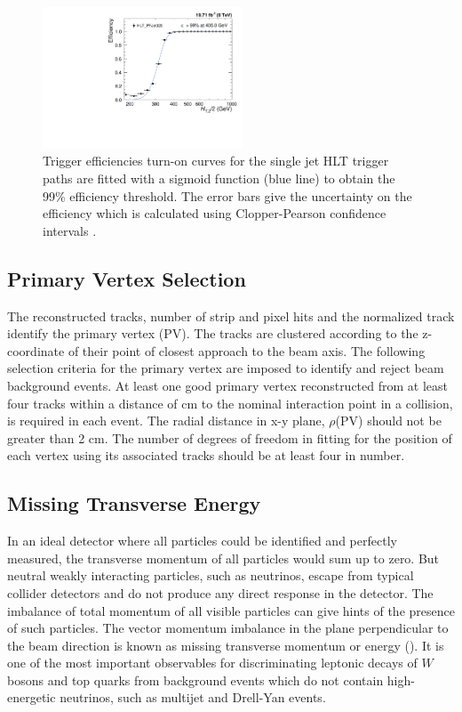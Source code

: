 \begin{figure}[!htbp]
\begin{center}
 \vspace*{6mm}
 \includegraphics[width=0.53\textwidth]{Plots_HT_2_150/Fit_Turn_Efficiency_320_2_ht_2.pdf}
 \caption[Trigger efficiencies turn-on curves for the single jet HLT trigger paths.]{Trigger efficiencies turn-on curves for the single jet HLT trigger paths are fitted with a sigmoid function (blue line) to obtain the 99\% efficiency threshold. The error bars give the uncertainty on the efficiency which is calculated using Clopper-Pearson confidence intervals \cite{10.2307/2331986}.}
 \label{fig:trig_eff}
 \end{center}
\end{figure}

\subsection{Primary Vertex Selection}
The reconstructed tracks, number of strip and pixel hits and the normalized track \chisq identify the primary vertex (PV). The tracks are clustered according to the z-coordinate of their point of closest approach to the beam axis. The following selection criteria for the primary vertex are imposed to identify and reject beam background events. At least one good primary vertex reconstructed from at least four tracks within a distance of  cm to the nominal interaction point in a collision, is required in each event. The radial distance in x-y plane, $\rho$(PV) should not be greater than 2 cm. The number of degrees of freedom in fitting for the position of each vertex using its associated tracks should be at least four in number. 

\subsection{Missing Transverse Energy}
In an ideal detector where all particles could be identified and perfectly measured, the transverse momentum of all particles would sum up to zero. But neutral weakly interacting particles, such as neutrinos, escape from typical collider detectors and do not produce any direct response in the detector. The imbalance of total momentum of all visible particles can give hints of the presence of such particles. The vector momentum imbalance in the plane perpendicular to the beam direction is known as missing transverse momentum or energy (\ETmiss). It is one of the most important observables for discriminating leptonic decays of $W$ bosons and top quarks from background events which do not contain high-energetic neutrinos, such as multijet and Drell-Yan events.%

